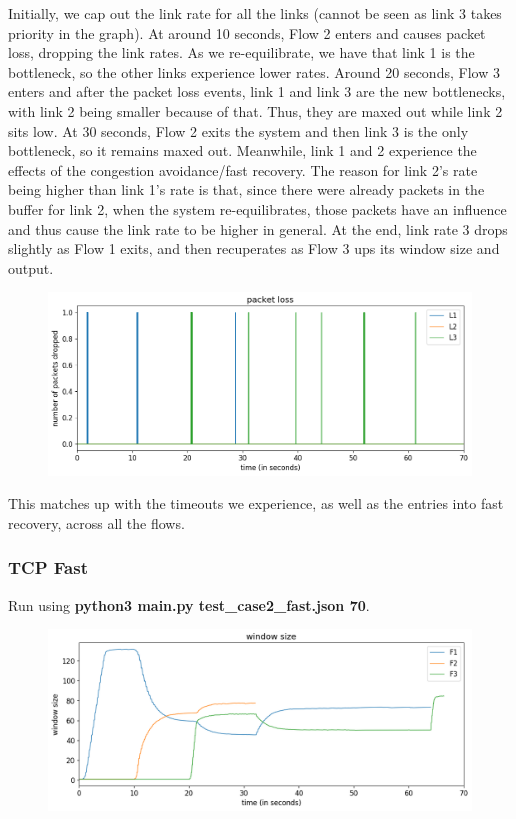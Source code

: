 \documentclass{article}
\begin{document}
Initially, we cap out the link rate for all the links (cannot be seen as link 3 takes priority in the graph). At around 10 seconds, Flow 2 enters and causes packet loss, dropping the link rates. As we re-equilibrate, we have that link 1 is the bottleneck, so the other links experience lower rates. Around 20 seconds, Flow 3 enters and after the packet loss events, link 1 and link 3 are the new bottlenecks, with link 2 being smaller because of that. Thus, they are maxed out while link 2 sits low. At 30 seconds, Flow 2 exits the system and then link 3 is the only bottleneck, so it remains maxed out. Meanwhile, link 1 and 2 experience the effects of the congestion avoidance/fast recovery. The reason for link 2's rate being higher than link 1's rate is that, since there were already packets in the buffer for link 2, when the system re-equilibrates, those packets have an influence and thus cause the link rate to be higher in general. At the end, link rate 3 drops slightly as Flow 1 exits, and then recuperates as Flow 3 ups its window size and output.

\begin{figure}[H]
\centering
\includegraphics[width = \textwidth]{"test_case2_reno packet loss"}
\end{figure}

This matches up with the timeouts we experience, as well as the entries into fast recovery, across all the flows.

\subsubsection{TCP Fast}

Run using \textbf{python3 main.py test\_case2\_fast.json 70}.

\begin{figure}[H]
\centering
\includegraphics[width = \textwidth]{"test_case2_fast window size"}
\end{figure}
\end{document}
